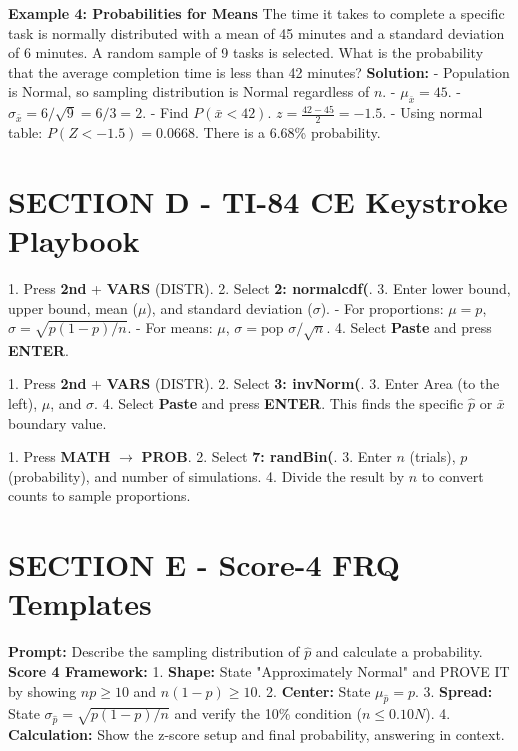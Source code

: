 \textbf{Example 4: Probabilities for Means}
The time it takes to complete a specific task is normally distributed with a mean of 45 minutes and a standard deviation of 6 minutes. A random sample of 9 tasks is selected. What is the probability that the average completion time is less than 42 minutes?
\textbf{Solution:}
- Population is Normal, so sampling distribution is Normal regardless of $n$.
- $\mu_{\bar{x}} = 45$.
- $\sigma_{\bar{x}} = 6/\sqrt{9} = 6/3 = 2$.
- Find $P(\bar{x} < 42)$. $z = \frac{42 - 45}{2} = -1.5$.
- Using normal table: $P(Z < -1.5) = 0.0668$.
There is a 6.68\% probability.

\section{SECTION D - TI-84 CE Keystroke Playbook}

\begin{calculatorbox}
1. Press \textbf{2nd} + \textbf{VARS} (DISTR).
2. Select \textbf{2: normalcdf(}.
3. Enter lower bound, upper bound, mean ($\mu$), and standard deviation ($\sigma$).
   - For proportions: $\mu = p$, $\sigma = \sqrt{p(1-p)/n}$.
   - For means: $\mu$, $\sigma = \text{pop }\sigma/\sqrt{n}$.
4. Select \textbf{Paste} and press \textbf{ENTER}.
\end{calculatorbox}

\begin{calculatorbox}
1. Press \textbf{2nd} + \textbf{VARS} (DISTR).
2. Select \textbf{3: invNorm(}.
3. Enter Area (to the left), $\mu$, and $\sigma$.
4. Select \textbf{Paste} and press \textbf{ENTER}. This finds the specific $\hat{p}$ or $\bar{x}$ boundary value.
\end{calculatorbox}

\begin{calculatorbox}
1. Press \textbf{MATH} $\rightarrow$ \textbf{PROB}.
2. Select \textbf{7: randBin(}.
3. Enter $n$ (trials), $p$ (probability), and number of simulations.
4. Divide the result by $n$ to convert counts to sample proportions.
\end{calculatorbox}

\section{SECTION E - Score-4 FRQ Templates}

\begin{frqrubricbox}
\textbf{Prompt:} Describe the sampling distribution of $\hat{p}$ and calculate a probability.
\textbf{Score 4 Framework:}
1. \textbf{Shape:} State "Approximately Normal" and PROVE IT by showing $np \geq 10$ and $n(1-p) \geq 10$.
2. \textbf{Center:} State $\mu_{\hat{p}} = p$.
3. \textbf{Spread:} State $\sigma_{\hat{p}} = \sqrt{p(1-p)/n}$ and verify the 10\% condition ($n \leq 0.10N$).
4. \textbf{Calculation:} Show the z-score setup and final probability, answering in context.
\end{frqrubricbox}

